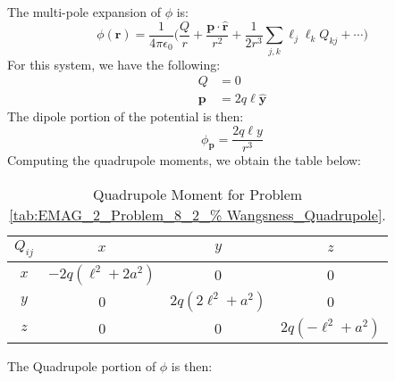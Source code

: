 \documentclass[crop=false,class=book,oneside]{standalone}
\begin{document}
            \begin{solution}
                The multi-pole expansion of $\phi$ is:
                \begin{equation}
                    \phi(\mathbf{r})=\frac{1}{4\pi\epsilon_{0}}\Big(
                    \frac{Q}{r}+
                    \frac{\mathbf{p}\cdot\hat{\mathbf{r}}}{r^{2}}
                    +\frac{1}{2r^{3}}\sum_{j,k}
                    \ell_{j}\ell_{k}Q_{kj}+\cdots\Big)
                \end{equation}
                For this system, we have the following:
                \begin{subequations}
                    \begin{align}
                        Q&=0\\
                        \mathbf{p}&=2q\ell\hat{\mathbf{y}}
                    \end{align}
                \end{subequations}
                The dipole portion of the potential is then:
                \begin{equation}
                    \phi_{\mathbf{p}}=
                    \frac{2q\ell{y}}{r^{3}}
                \end{equation}
                Computing the quadrupole moments, we obtain the
                table below:
                \begin{table}[H]
                    \centering
                    \captionsetup{type=table}
                    \begin{tabular}{|c|c|c|c|}
                        \hline
                        $Q_{ij}$&$x$&$y$&$z$\\
                        \hline
                        $x$&$-2q(\ell^{2}+2a^{2})$&0&0\\
                        \hline
                        $y$&0&$2q(2\ell^{2}+a^{2})$&0\\
                        \hline
                        $z$&0&0&$2q(-\ell^{2}+a^{2})$\\
                        \hline
                    \end{tabular}
                    \caption{Quadrupole Moment for Problem
                             \ref{tab:EMAG_2_Problem_8_2_%
                                  Wangsness_Quadrupole}.}
                    \label{tab:EMAG_2_Problem_8_4_%
                           Wangsness_Quadrupole}
                \end{table}
                The Quadrupole portion of $\phi$ is then:

\end{solution}
\end{document}
